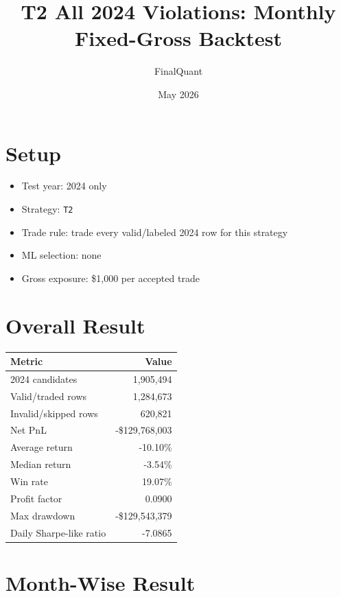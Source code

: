 \documentclass[11pt]{article}
\title{T2 All 2024 Violations: Monthly Fixed-Gross Backtest}
\author{FinalQuant}
\date{May 2026}
\begin{document}
\maketitle

\section{Setup}

\begin{itemize}
  \item Test year: 2024 only
  \item Strategy: \texttt{T2}
  \item Trade rule: trade every valid/labeled 2024 row for this strategy
  \item ML selection: none
  \item Gross exposure: \$1,000 per accepted trade
\end{itemize}

\section{Overall Result}

\begin{center}
\begin{tabular}{@{}lr@{}}
\toprule
Metric & Value \\
\midrule
2024 candidates & 1,905,494 \\
Valid/traded rows & 1,284,673 \\
Invalid/skipped rows & 620,821 \\
Net PnL & -\$129,768,003 \\
Average return & -10.10\% \\
Median return & -3.54\% \\
Win rate & 19.07\% \\
Profit factor & 0.0900 \\
Max drawdown & -\$129,543,379 \\
Daily Sharpe-like ratio & -7.0865 \\
\bottomrule
\end{tabular}
\end{center}

\section{Month-Wise Result}
\end{document}
